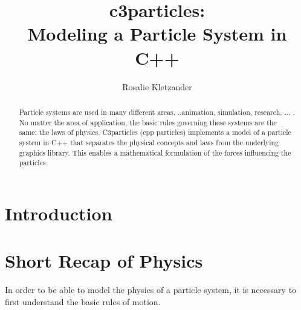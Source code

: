 \documentclass[runningheads,a4paper]{llncs}
\begin{document}
\mainmatter  %

\title{c3particles: \\ Modeling a Particle System in C++}


%
\author{Rosalie Kletzander}
%


\maketitle


\begin{abstract}
Particle systems are used in many different areas, ..animation, simulation, research, ... .
 No matter the area of application, the basic rules governing these systems are the same: the laws of physics. C3particles (cpp particles) implements a model of a particle system in C++ that separates the physical concepts and laws from the underlying graphics library. This enables a mathematical formulation of the forces influencing the particles.

\end{abstract}

\section{Introduction}

\section{Short Recap of Physics}

In order to be able to model the physics of a particle system, it is necessary to first understand the basic rules of motion.
\end{document}
